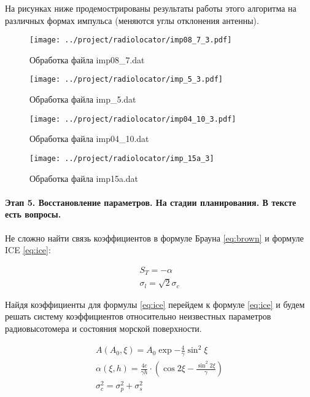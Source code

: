 На рисунках ниже продемострированы результаты работы этого алгоритма на
различных формах импульса (меняются углы отклонения антенны).

\begin{figure}[H]
    \centering
    \texttt{[image: ../project/radiolocator/imp08\_7\_3.pdf]}
    \caption{Обработка файла imp08\_7.dat}
    \label{fig:ex}
\end{figure}


\begin{figure}[H]
    \centering
    \texttt{[image: ../project/radiolocator/imp\_5\_3.pdf]}
    \caption{Обработка файла imp\_5.dat}
    \label{fig:ex}
\end{figure}


\begin{figure}[H]
    \centering
    \texttt{[image: ../project/radiolocator/imp04\_10\_3.pdf]}
    \caption{Обработка файла imp04\_10.dat}
    \label{fig:ex}
\end{figure}


\begin{figure}[H]
    \centering
    \texttt{[image: ../project/radiolocator/imp\_15a\_3]}
    \caption{Обработка файла imp15a.dat}
    \label{fig:ex}
\end{figure}




\paragraph{Этап 5. Восстановление параметров. На стадии планирования. В тексте
есть вопросы.}%
\label{par:etap_5_vosstanovlenie_parametrov_}

Не сложно найти связь коэффициентов в формуле Брауна \eqref{eq:brown} и формуле
ICE  \eqref{eq:ice}:

\begin{gather}
    \label{eq:}
    S_T = - \alpha\\
    \sigma_l = \sqrt 2 \sigma_c
\end{gather}

Найдя коэффициенты для формулы \eqref{eq:ice} перейдем к формуле \eqref{eq:ice}
и будем решать систему коэффициентов относительно неизвестных параметров
радиовысотомера и состояния морской поверхности.

\begin{gather}
    A(A_0,\xi) = A_0 \exp{-\frac{4}{\gamma} \sin^2 \xi} \\
    \alpha(\xi,h) = \frac{4c}{\gamma h} \cdot (\cos 2\xi - 
            \frac{\sin^2 2\xi}{\gamma}) \\
    \sigma_c^2 = \sigma_p^2 + \sigma_s^2
\end{gather}


